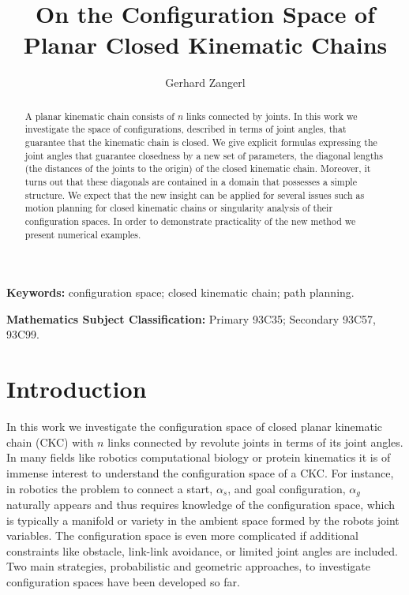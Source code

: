 \documentclass[10pt,a4paper]{article}
\title{On the Configuration Space of Planar Closed Kinematic Chains}
\author{Gerhard Zangerl}
\date{}
\theoremstyle{definition}
\theoremstyle{remark}
\numberwithin{equation}{section}
\begin{document}
\maketitle




\begin{abstract}
\noindent A planar kinematic chain consists of $n$ links connected by joints. In this work we investigate the space of configurations, described in terms of joint angles, that guarantee that the kinematic chain is closed. We give explicit formulas expressing the joint angles that guarantee closedness by a new set of parameters, the diagonal lengths  (the distances of the joints to the origin) of the closed kinematic chain. Moreover, it turns out that these diagonals are contained in a domain that possesses a simple structure. We expect that the new insight can be applied for several issues such as motion planning for closed kinematic chains or singularity analysis of their configuration spaces. In order to demonstrate practicality of the new method we present numerical examples.   
\end{abstract}

\begin{center}
\small
\textbf{Keywords:}
configuration space; closed kinematic chain; path planning.

\textbf{Mathematics Subject Classification:}
Primary 93C35; Secondary 93C57, 93C99.
\end{center}



\section{Introduction}







In this work we investigate  the configuration space of closed planar kinematic chain (CKC) with $n$ links connected by revolute joints in terms of its joint angles. In many fields like robotics computational biology or protein kinematics it is of immense interest to understand the configuration space of a CKC. For instance, in robotics the problem to connect a start, $\alpha_s$, and goal configuration, $\alpha_g$ naturally appears and thus requires knowledge of the configuration space, which is typically a manifold or variety in the ambient space formed by the robots joint variables. The configuration space is even more complicated if additional constraints like obstacle, link-link avoidance, or limited joint angles are included. Two main strategies, probabilistic and geometric approaches, to investigate configuration spaces have been developed so far.\\
\end{document}
